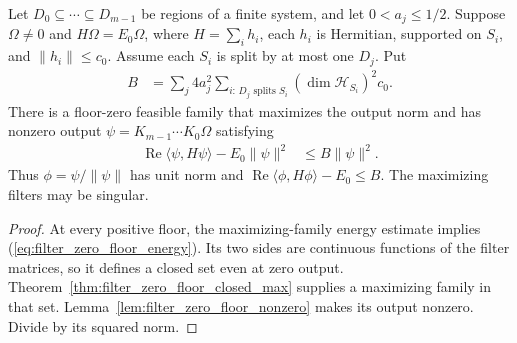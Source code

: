 \begin{theorem}
    \label{thm:filter_zero_floor_energy}
    \leanok
    Let $D_0\subseteq\cdots\subseteq D_{m-1}$ be regions of a finite system,
    and let $0<a_j\le1/2$. Suppose $\Omega\ne0$ and $H\Omega=E_0\Omega$,
    where $H=\sum_i h_i$, each $h_i$ is Hermitian, supported on $S_i$,
    and $\lVert h_i\rVert\le c_0$. Assume each $S_i$ is split by at most
    one $D_j$. Put
    \begin{align}
        B & =\sum_j4a_j^2\sum_{i:\,D_j\text{ splits }S_i}
        (\dim\mathcal H_{S_i})^2c_0.
    \end{align}
    There is a floor-zero feasible family that maximizes the output norm
    and has nonzero output $\psi=K_{m-1}\cdots K_0\Omega$ satisfying
    \begin{align}
        \operatorname{Re}\langle\psi,H\psi\rangle-E_0\lVert\psi\rVert^2
         & \le B\lVert\psi\rVert^2.
        \label{eq:filter_zero_floor_energy}
    \end{align}
    Thus $\phi=\psi/\lVert\psi\rVert$ has unit norm and
    $\operatorname{Re}\langle\phi,H\phi\rangle-E_0\le B$.
    The maximizing filters may be singular.
\end{theorem}
\begin{proof}\leanok
    At every positive floor, the maximizing-family energy estimate
    implies (\ref{eq:filter_zero_floor_energy}). Its two sides are
    continuous functions of the filter matrices, so it defines a closed
    set even at zero output. Theorem~\ref{thm:filter_zero_floor_closed_max}
    supplies a maximizing family in that set.
    Lemma~\ref{lem:filter_zero_floor_nonzero} makes its output nonzero.
    Divide by its squared norm.
\end{proof}


